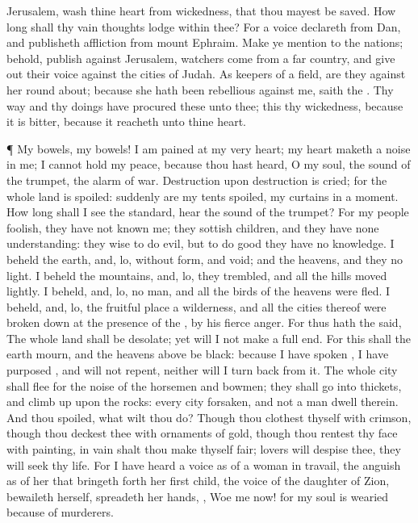 {Jerusalem,
wash thine
heart from
wickedness, that thou mayest be
saved. How long shall thy
vain
thoughts
lodge
within thee?
For a
voice
declareth from
Dan, and
publisheth
affliction from
mount
Ephraim.
Make ye
mention to the
nations; behold,
publish against
Jerusalem,
{}
watchers
come from a
far
country, and give
out their
voice against the
cities of
Judah.
As
keepers of a
field, are they against her round
about; because she hath been
rebellious against me,
saith the
{}.
Thy
way and thy
doings have
procured these
{} unto thee; this
{} thy
wickedness, because it is
bitter, because it
reacheth unto thine
heart.
\par }{\PP {}¶ My
bowels, my
bowels! I am
pained at my
very
heart; my
heart maketh a
noise in me; I cannot hold my
peace, because thou hast
heard, O my
soul, the
sound of the
trumpet, the
alarm of
war.
Destruction upon
destruction is
cried; for the whole
land is
spoiled:
suddenly are my
tents
spoiled,
{} my
curtains in a
moment.
How long shall I
see the
standard,
{}
hear the
sound of the
trumpet?
For my
people
{}
foolish, they have not
known me; they
{}
sottish
children, and they have none
understanding: they
{}
wise to do
evil, but to do
good they have no
knowledge.
I
beheld the
earth, and, lo,
{} without
form, and
void; and the
heavens, and they
{} no
light.
I
beheld the
mountains, and, lo, they
trembled, and all the
hills moved
lightly.
I
beheld, and, lo,
{} no
man, and all the
birds of the
heavens were
fled.
I
beheld, and, lo, the fruitful
place
{} a
wilderness, and all the
cities thereof were broken
down at the
presence of the
{},
{} by his
fierce
anger.
For thus hath the
{}
said, The whole
land shall be
desolate; yet will I not
make a full
end.
For this shall the
earth
mourn, and the
heavens
above be
black: because I have
spoken
{}, I have
purposed
{}, and will not
repent, neither will I turn
back from it.
The whole
city shall
flee for the
noise of the
horsemen and
bowmen; they shall
go into
thickets, and climb
up upon the
rocks: every
city
{}
forsaken, and not a
man
dwell
therein.
And
{} thou
{}
spoiled, what wilt thou
do? Though thou
clothest thyself with
crimson, though thou
deckest thee with
ornaments of
gold, though thou
rentest thy
face with
painting, in
vain shalt thou make thyself
fair;
{}
lovers will
despise thee, they will
seek thy
life.
For I have
heard a
voice as of a woman in
travail,
{} the
anguish as of her that bringeth forth her first
child, the
voice of the
daughter of
Zion,
{}
bewaileth herself,
{}
spreadeth her
hands,
{},
Woe
{} me now! for my
soul is
wearied because of
murderers.

}
